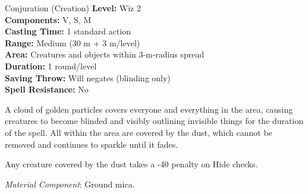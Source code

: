 {Conjuration (Creation)}
{
	\textbf{Level:}
	Wiz 2\\
	\textbf{Components:}
	V, S, M\\
	\textbf{Casting Time:}
	1 standard action\\
	\textbf{Range:}
	Medium (30 m + 3 m/level)\\
	\textbf{Area:}
	Creatures and objects within 3-m-radius spread\\
	\textbf{Duration:}
	1 round/level\\
	\textbf{Saving Throw:}
	Will negates (blinding only)\\
	\textbf{Spell Resistance:}
	No\\
}
{
	A cloud of golden particles covers everyone and everything in the area, causing creatures to become blinded and visibly outlining invisible things for the duration of the spell. All within the area are covered by the dust, which cannot be removed and continues to sparkle until it fades.

	Any creature covered by the dust takes a -40 penalty on Hide checks.

	\textit{Material Component}:
	Ground mica.

}
